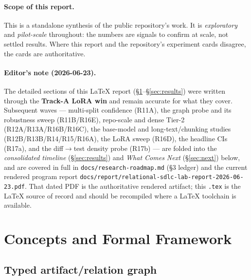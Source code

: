 \documentclass[11pt]{article}
\begin{document}
\paragraph{Scope of this report.}
This is a standalone synthesis of the public repository's work. It is
\emph{exploratory} and \emph{pilot-scale} throughout: the numbers are signals to
confirm at scale, not settled results. Where this report and the repository's
experiment cards disagree, the cards are authoritative.

\paragraph{Editor's note (2026-06-23).}
The detailed sections of this \LaTeX{} report (\S\ref{sec:concepts}--\S\ref{sec:results})
were written through the \textbf{Track-A LoRA win} and remain accurate for what they
cover. Subsequent waves --- multi-split confidence (R11A), the graph probe and its
robustness sweep (R11B/R16E), repo-scale and dense Tier-2 (R12A/R13A/R16B/R16C), the
base-model and long-text/chunking studies (R12B/R13B/R14/R15/R16A), the LoRA sweep
(R16D), the headline CIs (R17a), and the diff$\to$test density probe (R17b) --- are
folded into the \emph{consolidated timeline} (\S\ref{sec:results}) and
\emph{What Comes Next} (\S\ref{sec:next}) below, and are covered in full in
\texttt{docs/research-roadmap.md} (\S3 ledger) and the current rendered program report
\texttt{docs/report/relational-sdlc-lab-report-2026-06-23.pdf}. That dated PDF is the
authoritative rendered artifact; this \texttt{.tex} is the \LaTeX{} source of record and
should be recompiled where a \LaTeX{} toolchain is available.

\section{Concepts and Formal Framework}
\label{sec:concepts}

\subsection{Typed artifact/relation graph}
\end{document}
